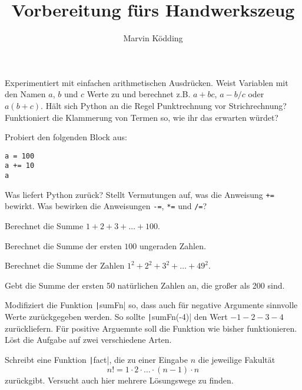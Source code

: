 \documentclass[a4paper, 12pt]{mksheetphhd}
\title{Vorbereitung fürs Handwerkszeug}
\author{Marvin Ködding}
\begin{document}
	\printtitle
	
	\vspace*{1cm}
	
	\begin{aufgabe}
		Experimentiert mit einfachen arithmetischen Ausdrücken. Weist Variablen mit den Namen $a$, $b$ und $c$ Werte zu und berechnet z.B. $a + bc$, $a - b/c$ oder $a(b + c)$. Hält sich Python an die Regel \glqq{}Punktrechnung vor Strichrechnung\grqq{}? Funktioniert die Klammerung von Termen so, wie ihr das erwarten würdet?
	\end{aufgabe}

	
	\begin{aufgabe}
		Probiert den folgenden Block aus:
		
		\begin{verbatim}
a = 100
a += 10
a
		\end{verbatim}
		
		Was liefert Python zurück? Stellt Vermutungen auf, was die Anweisung \verb*|+=| bewirkt. Was bewirken die Anweisungen \verb*|-=|, \verb*|*=| und \verb*|/=|?
	\end{aufgabe}
	
	\begin{aufgabe}
		Berechnet die Summe $1 + 2 + 3 + \dots + 100$.
	\end{aufgabe}
	
	\begin{aufgabe}
		Berechnet die Summe der ersten $100$ ungeraden Zahlen.
	\end{aufgabe}
	
	\begin{aufgabe}
		Berechnet die Summe der Zahlen $1^2 + 2^2 + 3^2 + \dots + 49^2$.
	\end{aufgabe}
	
	\begin{aufgabe}
		Gebt die Summe der ersten 50 natürlichen Zahlen an, die großer als 200 sind.
	\end{aufgabe}
	
	\begin{aufgabe}
		Modifiziert die Funktion \texttt|sumFn| so, dass auch für negative Argumente sinnvolle Werte zurückgegeben werden. So sollte \texttt|sumFn(-4)| den Wert $-1-2-3-4$ zurückliefern. Für positive Arguemnte soll die Funktion wie bisher funktionieren. Löst die Aufgabe auf zwei verschiedene Arten.
	\end{aufgabe}
	\newpage
	
	\begin{aufgabe}
		Schreibt eine Funktion \texttt|fact|, die zu einer Eingabe $n$ die jeweilige Fakultät $$n! = 1 \cdot 2 \cdot \dots \cdot (n-1) \cdot n$$ zurückgibt. Versucht auch hier mehrere Lösungswege zu finden.
	\end{aufgabe}
	
	\printlicense
	
	\printsocials
	
\end{document}
